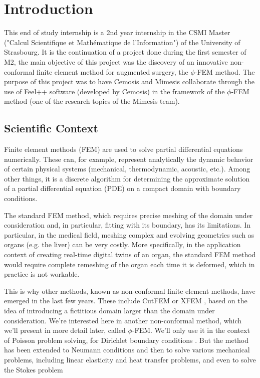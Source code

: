 \section{Introduction}

This end of study internship is a 2nd year internship in the CSMI Master ("Calcul Scientifique et Mathématique de l'Information") of the University of Strasbourg. It is the continuation of a project done during the first semester of M2, the main objective of this project was the discovery of an innovative non-conformal finite element method for augmented surgery, the $\phi$-FEM method. The purpose of this project was to have Cemosis and Mimesis collaborate through the use of Feel++ software (developed by Cemosis) in the framework of the $\phi$-FEM method (one of the research topics of the Mimesis team).

\subsection{Scientific Context}

Finite element methods (FEM) are used to solve partial differential equations numerically. These can, for example, represent analytically the dynamic behavior of certain physical systems (mechanical, thermodynamic, acoustic, etc.). Among other things, it is a discrete algorithm for determining the approximate solution of a partial differential equation (PDE) on a compact domain with boundary conditions. 

The standard FEM method, which requires precise meshing of the domain under consideration and, in particular, fitting with its boundary, has its limitations. In particular, in the medical field, meshing complex and evolving geometries such as organs (e.g. the liver) can be very costly. More specifically, in the application context of creating real-time digital twins of an organ, the standard FEM method would require complete remeshing of the organ each time it is deformed, which in practice is not workable. 

This is why other methods, known as non-conformal finite element methods, have emerged in the last few years. These include CutFEM \cite{burman_cutfem_2015} or XFEM \cite{moes_x-fem_2002}, based on the idea of introducing a fictitious domain larger than the domain under consideration. We're interested here in another non-conformal method, which we'll present in more detail later, called $\phi$-FEM. We'll only use it in the context of Poisson problem solving, for Dirichlet boundary conditions \cite{duprez_phi-fem_2020}. But the method has been extended to Neumann conditions \cite{duprez_new_2023} and then to solve various mechanical problems, including linear elasticity and heat transfer problems, and even to solve the Stokes problem \cite{duprez_phi-fem_2023}


